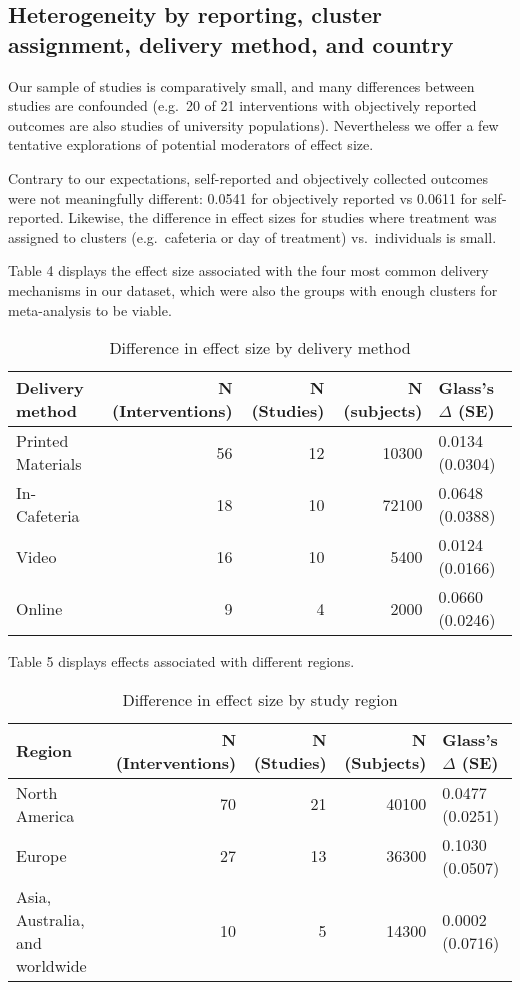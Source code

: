 \documentclass[sn-nature,pdflatex]{sn-jnl}
\begin{document}
\subsection{Heterogeneity by reporting, cluster assignment, delivery
method, and country}\label{sec2.10}

Our sample of studies is comparatively small, and many differences
between studies are confounded (e.g.~20 of 21 interventions with
objectively reported outcomes are also studies of university
populations). Nevertheless we offer a few tentative explorations of
potential moderators of effect size.

Contrary to our expectations, self-reported and objectively collected
outcomes were not meaningfully different: 0.0541 for objectively
reported vs 0.0611 for self-reported. Likewise, the difference in effect
sizes for studies where treatment was assigned to clusters
(e.g.~cafeteria or day of treatment) vs.~individuals is small.

Table 4 displays the effect size associated with the four most common
delivery mechanisms in our dataset, which were also the groups with
enough clusters for meta-analysis to be viable.

\begin{table}[!h]
\centering
\caption{\label{tab:tab:table_four}Difference in effect size by delivery method}
\centering
\begin{tabular}[t]{lrrrl}
\toprule
Delivery method & N (Interventions) & N (Studies) & N (subjects) & Glass's $\Delta$ (SE)\\
\midrule
Printed Materials & 56 & 12 & 10300 & 0.0134 (0.0304)\\
In-Cafeteria & 18 & 10 & 72100 & 0.0648 (0.0388)\\
Video & 16 & 10 & 5400 & 0.0124 (0.0166)\\
Online & 9 & 4 & 2000 & 0.0660 (0.0246)\\
\bottomrule
\end{tabular}
\end{table}

Table 5 displays effects associated with different regions.

\begin{table}[!h]
\centering
\caption{\label{tab:tab:table_five}Difference in effect size by study region}
\centering
\begin{tabular}[t]{lrrrl}
\toprule
Region & N (Interventions) & N (Studies) & N (Subjects) & Glass's $\Delta$ (SE)\\
\midrule
North America & 70 & 21 & 40100 & 0.0477 (0.0251)\\
Europe & 27 & 13 & 36300 & 0.1030 (0.0507)\\
Asia, Australia, and worldwide & 10 & 5 & 14300 & 0.0002 (0.0716)\\
\bottomrule
\end{tabular}
\end{table}
\end{document}
